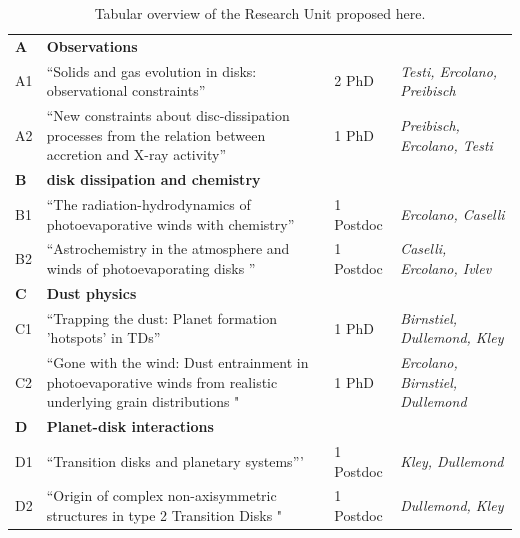 \documentclass[10pt,fleqn,twoside]{article}
\newcommand{\AreacolA}{\color{blue}}
\newcommand{\AreacolB}{\color{Green}}
\newcommand{\AreacolC}{\color{YellowOrange}}
\newcommand{\AreacolD}{\color{Red}}
\begin{document}
\begin{table}
\noindent
\begin{tabular}{p{0.7cm}p{8cm}p{2.0cm}p{3.3cm}}
\hline
{\bf\AreacolA A} & {\bf\AreacolA Observations} & & \\ 
A1 & ``Solids and gas evolution in disks: observational constraints'' & 2 PhD & {\em Testi, Ercolano, Preibisch}\\
A2 & ``New constraints about disc-dissipation processes from the relation between accretion and X-ray activity'' & 1 PhD & {\em Preibisch, Ercolano, Testi}\\
\hline
{\bf\AreacolB B} & {\bf\AreacolB disk dissipation and chemistry} & & \\ 
B1 & ``The radiation-hydrodynamics of photoevaporative winds with chemistry'' & 1 Postdoc & {\em Ercolano, Caselli}\\
B2 & ``Astrochemistry in the atmosphere and winds of photoevaporating disks '' & 1 Postdoc & {\em
                                                              Caselli,
                                                              Ercolano,
                                                              Ivlev}\\
\hline
{\bf\AreacolC C} & {\bf\AreacolC Dust physics} & & \\ 
C1 & ``Trapping the dust: Planet formation 'hotspots' in TDs'' & 1 PhD
                               & {\em Birnstiel, Dullemond, Kley}\\
C2 & ``Gone with the wind: Dust entrainment in photoevaporative winds
     from realistic underlying grain distributions "& 1 PhD & {\em
                                                              Ercolano,
                                                              Birnstiel,
                                                              Dullemond}\\
\hline
{\bf\AreacolD D} & {\bf\AreacolD Planet-disk interactions} & & \\ 
D1 & ``Transition disks and planetary systems''' & 1 Postdoc & {\em Kley, Dullemond}\\
D2 & ``Origin of complex non-axisymmetric structures in type 2
     Transition Disks "& 1 Postdoc & {\em Dullemond, Kley}\\
\hline
\end{tabular}
\caption{\label{table-overview-ru}
Tabular overview of the Research Unit proposed here.}
\end{table}
\end{document}
